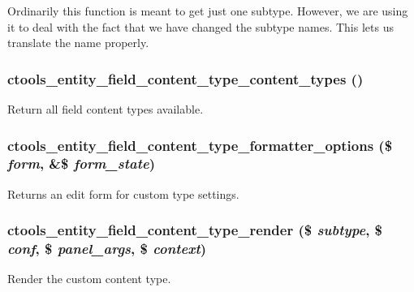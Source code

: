 Ordinarily this function is meant to get just one subtype. However, we are using it to deal with the fact that we have changed the subtype names. This lets us translate the name properly. \hypertarget{entity__field_8inc_a785e767ce2c1805d7d1fb662548e42bd}{
\subsubsection[{ctools\_\-entity\_\-field\_\-content\_\-type\_\-content\_\-types}]{\setlength{\rightskip}{0pt plus 5cm}ctools\_\-entity\_\-field\_\-content\_\-type\_\-content\_\-types ()}}
\label{entity__field_8inc_a785e767ce2c1805d7d1fb662548e42bd}
Return all field content types available. \hypertarget{entity__field_8inc_a63949a8688796a644b579777c3be743b}{
\subsubsection[{ctools\_\-entity\_\-field\_\-content\_\-type\_\-formatter\_\-options}]{\setlength{\rightskip}{0pt plus 5cm}ctools\_\-entity\_\-field\_\-content\_\-type\_\-formatter\_\-options (\$ {\em form}, \/  \&\$ {\em form\_\-state})}}
\label{entity__field_8inc_a63949a8688796a644b579777c3be743b}
Returns an edit form for custom type settings. \hypertarget{entity__field_8inc_a33ebb34ff4cd42a079450e025e3eaf18}{
\subsubsection[{ctools\_\-entity\_\-field\_\-content\_\-type\_\-render}]{\setlength{\rightskip}{0pt plus 5cm}ctools\_\-entity\_\-field\_\-content\_\-type\_\-render (\$ {\em subtype}, \/  \$ {\em conf}, \/  \$ {\em panel\_\-args}, \/  \$ {\em context})}}
\label{entity__field_8inc_a33ebb34ff4cd42a079450e025e3eaf18}
Render the custom content type. 

